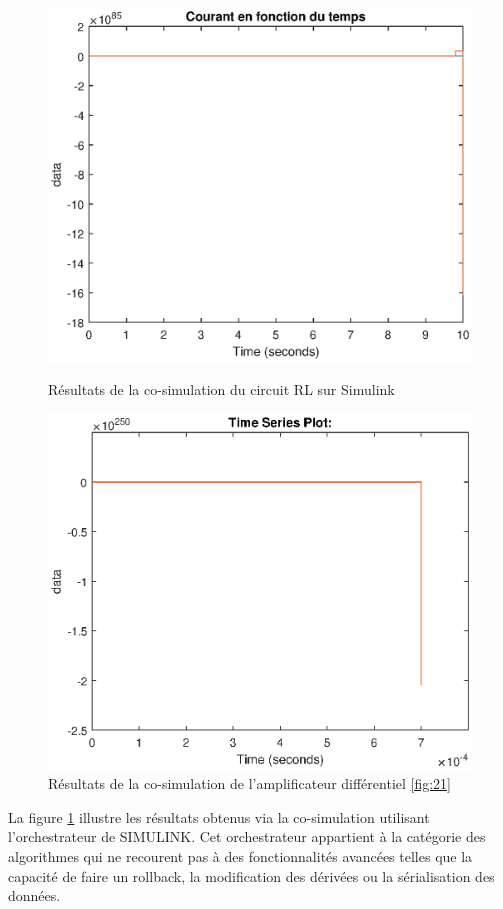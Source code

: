 \begin{figure}[hbt!]
    \centering
    \begin{minipage}[b]{0.45\textwidth}
        \includegraphics[width=\textwidth]{RL.eps}
        \caption{Résultats de la co-simulation du circuit RL sur Simulink}

    \end{minipage}
    \begin{minipage}[b]{0.45\textwidth}
      \includegraphics[width=\textwidth]{differenceAmplifier.eps}
      \caption{Résultats de la co-simulation de l'amplificateur différentiel \ref{fig:21} }
  \end{minipage}
  \label{fig:31}
  \end{figure}
  La figure \ref{fig:31} illustre les résultats obtenus via la co-simulation utilisant l'orchestrateur de SIMULINK. Cet orchestrateur appartient à la catégorie des algorithmes qui ne recourent pas à des fonctionnalités avancées telles que la capacité de faire un rollback, la modification des dérivées ou la sérialisation des données.

